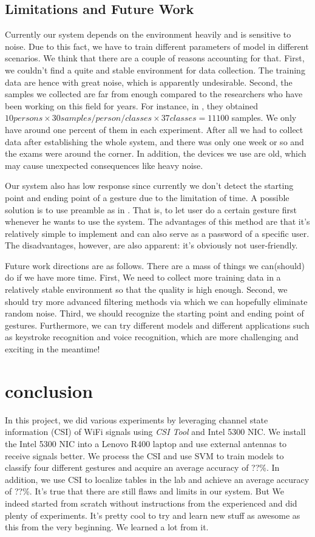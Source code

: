 \documentclass[conference]{IEEEtran}
\begin{document}
\subsection{Limitations and Future Work}
Currently our system depends on the environment heavily and is sensitive to noise. Due to this fact, we have to train different parameters of model in different scenarios. We think that there are a couple of reasons accounting for that. 
First, we couldn't find a quite and stable environment for data collection. The training data are hence with great noise, which is apparently undesirable. 
Second, the samples we collected are far from enough compared to the researchers who have been working on this field for years. For instance, in \cite{ali2015keystroke}, they obtained $10 persons \times 30samples/person/classes \times 37classes = 11100$ samples. We only have around one percent of them in each experiment. After all we had to collect data after establishing the whole system, and there was only one week or so and the exams were around the corner. In addition, the devices we use are old, which may cause unexpected consequences like heavy noise.

Our system also has low response since currently we don't detect the starting point and ending point of a gesture due to the limitation of time. A possible solution is to use preamble as in \cite{pu2013whole}. That is, to let user do a certain gesture first whenever he wants to use the system. The advantages of this method are that it's relatively simple to implement and can also serve as a password of a specific user. The disadvantages, however, are also apparent: it's obviously not user-friendly.

Future work directions are as follows. There are a mass of things we can(should) do if we have more time. First, We need to collect more training data in a relatively stable environment so that the quality is high enough. Second, we should try more advanced filtering methods via which we can hopefully eliminate random noise. Third, we should recognize the starting point and ending point of gestures. Furthermore, we can try different models and different applications such as keystroke recognition and voice recognition, which are more challenging and exciting in the meantime!

\section{conclusion} \label{section-conclusion}
In this project, we did various experiments by leveraging channel state information (CSI) of WiFi signals using \emph{CSI Tool} and Intel 5300 NIC.
We install the Intel 5300 NIC into a Lenovo R400 laptop and use external antennas to receive signals better.
We process the CSI and use SVM to train models to classify four different gestures and acquire an average accuracy of ??\%.
In addition, we use CSI to localize tables in the lab and achieve an average accuracy of ??\%.
It's true that there are still flaws and limits in our system. But We indeed started from scratch without instructions from the experienced and did plenty of experiments. It's pretty cool to try and learn new stuff as awesome as this from the very beginning. We learned a lot from it.
\end{document}
